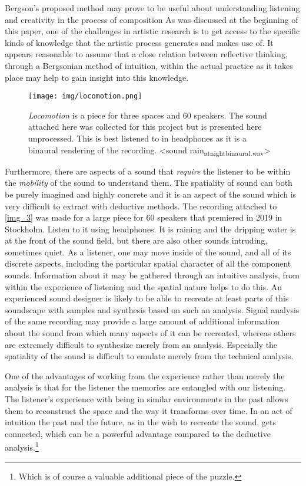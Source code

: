 \documentclass[11pt]{article}
\begin{document}
Bergson's proposed method may prove to be useful about understanding listening and creativity in the process of composition
As was discussed at the beginning of this paper, one of the challenges in artistic research is to get access to the specific kinds of knowledge that the artistic process generates and makes use of. It appears reasonable to assume that a close relation between reflective thinking, through a Bergsonian method of intuition, within the actual practice as it takes place may help to gain insight into this knowledge.

\begin{figure}[htbp]
\centering
\texttt{[image: img/locomotion.png]}
\caption{\label{fig:org6ec3d75}\emph{Locomotion} is a piece for three spaces and 60 speakers. The sound attached here was collected for this project but is presented here unprocessed. This is best listened to in headphones as it is a binaural rendering of the recording.  <sound rain\textsubscript{at}\textsubscript{night}\textsubscript{binaural.wav}>}
\end{figure}

Furthermore, there are aspects of a sound that \emph{require} the listener to be within the \emph{mobility} of the sound to understand them. The spatiality of sound can both be purely imagined and highly concrete and it is an aspect of the sound which is very difficult to extract with deductive methods. The recording attached to \ref{img_3} was made for a large piece for 60 speakers that premiered in 2019 in Stockholm. Listen to it using headphones. It is raining and the dripping water is at the front of the sound field, but there are also other sounds intruding, sometimes quiet.
As a listener, one may move inside of the sound, and all of its discrete aspects, including the particular spatial character of all the component sounds.
Information about it may be gathered through an intuitive analysis, from within the experience of listening and the spatial nature helps to do this.
An experienced sound designer is likely to be able to recreate at least parts of this soundscape with samples and synthesis based on such an analysis.
Signal analysis of the same recording may provide a large amount of additional information about the sound from which many aspects of it can be recreated, whereas others are extremely difficult to synthesize merely from an analysis.
Especially the spatiality of the sound is difficult to emulate merely from the technical analysis.

One of the advantages of working from the experience rather than merely the analysis is that for the listener the memories are entangled with our listening.
The listener's experience with being in similar environments in the past allows them to reconstruct the space and the way it transforms over time.
In an act of intuition the past and the future, as in the wish to recreate the sound, gets connected, which can be a powerful advantage compared to the deductive analysis.\footnote{Which is of course a valuable additional piece of the puzzle.} 
\end{document}
